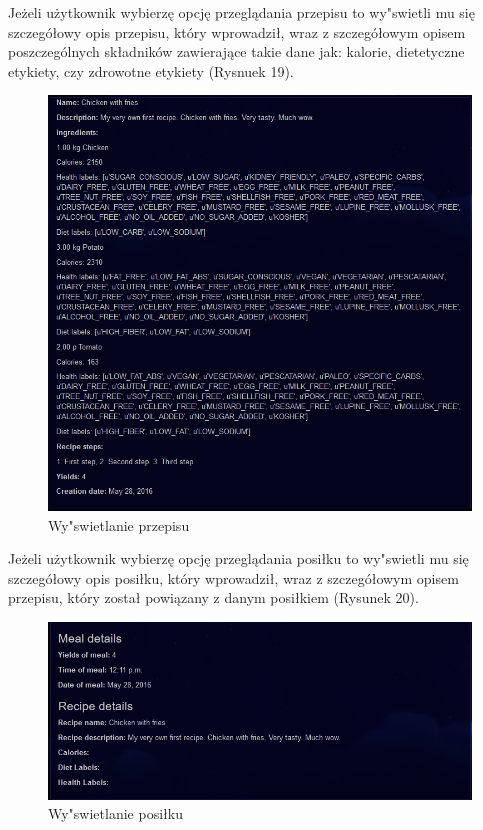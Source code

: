 \documentclass{article}
\begin{document}
Jeżeli użytkownik wybierzę opcję przeglądania przepisu to wy"swietli mu się szczegółowy opis przepisu, który wprowadził, wraz z szczegółowym opisem poszczególnych składników zawierające takie dane jak: kalorie, dietetyczne etykiety, czy zdrowotne etykiety (Rysnuek 19).
\begin{figure}[!ht]
  \centering
   \includegraphics[width=1\textwidth]{reshp10}\par\vspace{1cm}
  \caption{Wy"swietlanie przepisu}
\end{figure}
\newpage
Jeżeli użytkownik wybierzę opcję przeglądania posiłku to wy"swietli mu się szczegółowy opis posiłku, który wprowadził, wraz z szczegółowym opisem przepisu, który został powiązany z danym posiłkiem (Rysunek 20).
\begin{figure}[!ht]
  \centering
   \includegraphics[width=1\textwidth]{reshp11}\par\vspace{1cm}
  \caption{Wy"swietlanie posiłku}
\end{figure}
\end{document}
